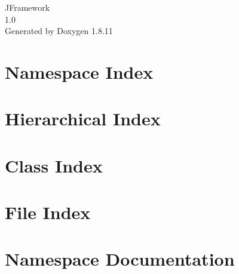 \documentclass[twoside]{book}
\newcommand{\+}{\discretionary{\mbox{\scriptsize$\hookleftarrow$}}{}{}}
\newcommand{\clearemptydoublepage}{%
  \newpage{\pagestyle{empty}\cleardoublepage}%
}
\begin{document}
\hypersetup{pageanchor=false,
             bookmarksnumbered=true,
             pdfencoding=unicode
            }
\begin{titlepage}
\vspace*{7cm}
\begin{center}%
{\Large J\+Framework \\[1ex]\large 1.\+0 }\\
\vspace*{1cm}
{\large Generated by Doxygen 1.8.11}\\
\end{center}
\end{titlepage}
\clearemptydoublepage
\tableofcontents
\clearemptydoublepage
{}
\hypersetup{pageanchor=true}

\chapter{Namespace Index}

\chapter{Hierarchical Index}

\chapter{Class Index}

\chapter{File Index}

\chapter{Namespace Documentation}






\end{document}
